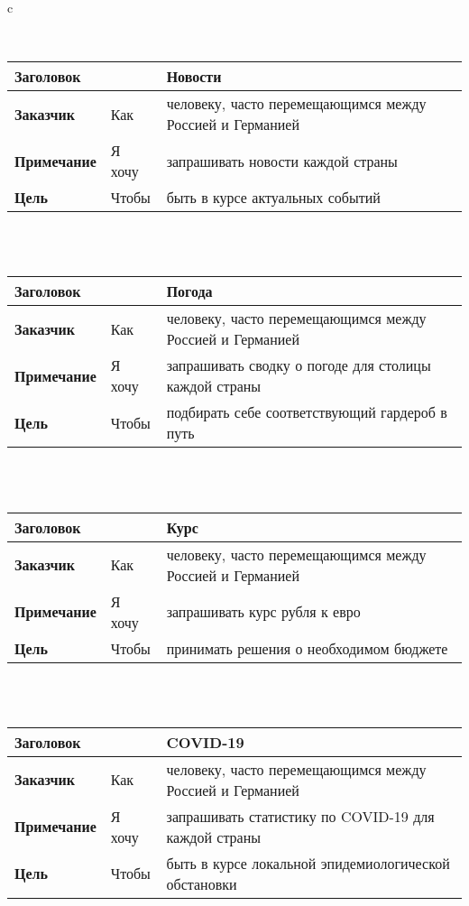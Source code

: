 \documentclass[border={3pt 0cm 3pt 0cm}]{standalone}
\begin{document}
\begin{tabular}{c}

\smallskip \\

\begin{tabular}{|l|l|l|}
	\hline
	\multicolumn{2}{|l|}{\textbf{Заголовок}} & Новости \\
		\hline
		\textbf{Заказчик} & Как & человеку, часто перемещающимся между Россией и Германией \\
	\hline
	\textbf{Примечание} & Я хочу & запрашивать новости каждой страны \\
	\hline
	\textbf{Цель} & Чтобы & быть в курсе актуальных событий \\
	\hline
\end{tabular} \\

\smallskip \\

\begin{tabular}{|l|l|l|}
	\hline
	\multicolumn{2}{|l|}{\textbf{Заголовок}} & Погода \\
	\hline
	\textbf{Заказчик} & Как & человеку, часто перемещающимся между Россией и Германией \\
	\hline
	\textbf{Примечание} & Я хочу & запрашивать сводку о погоде для столицы каждой страны \\
	\hline
	\textbf{Цель} & Чтобы & подбирать себе соответствующий гардероб в путь \\
	\hline
\end{tabular} \\

\smallskip \\

\begin{tabular}{|l|l|l|}
	\hline
	\multicolumn{2}{|l|}{\textbf{Заголовок}} & Курс \\
	\hline
	\textbf{Заказчик} & Как & человеку, часто перемещающимся между Россией и Германией \\
	\hline
	\textbf{Примечание} & Я хочу & запрашивать курс рубля к евро \\
	\hline
	\textbf{Цель} & Чтобы & принимать решения о необходимом бюджете \\
	\hline
\end{tabular} \\

\smallskip \\

\begin{tabular}{|l|l|l|}
	\hline
	\multicolumn{2}{|l|}{\textbf{Заголовок}} & COVID-19 \\
	\hline
	\textbf{Заказчик} & Как & человеку, часто перемещающимся между Россией и Германией \\
	\hline
	\textbf{Примечание} & Я хочу & запрашивать статистику по COVID-19 для каждой страны \\
	\hline
	\textbf{Цель} & Чтобы & быть в курсе локальной эпидемиологической обстановки \\
	\hline
\end{tabular} \\

\smallskip \\

\end{tabular}
\end{document}
